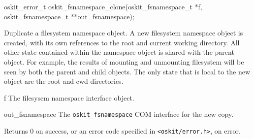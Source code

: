 \begin{apisyn}

	\funcproto oskit_error_t
	oskit_fsnamespace_clone(oskit_fsnamespace_t *f,
			oskit_fsnamespace_t **out_fsnamespace);
\end{apisyn}
\begin{apidesc}
	Duplicate a filesystem namespace object. A new filesystem namespace
	object is created, with its own references to the root and current
	working directory. All other state contained within the namespace
	object is shared with the parent object. For example, the results
	of mounting and unmounting filesystem will be seen by both the
	parent and child objects. The only state that is local to the new
	object are the root and cwd directories. 
\end{apidesc}
\begin{apiparm}
	\item[f]
		The \oskit{} filesysem namespace interface object.
	\item[out_fsnamespace]
		The {\tt oskit_fsnamespace} COM interface for the new copy.
\end{apiparm}
\begin{apiret}
	Returns 0 on success, or an error code specified in
	{\tt <oskit/error.h>}, on error.
\end{apiret}

